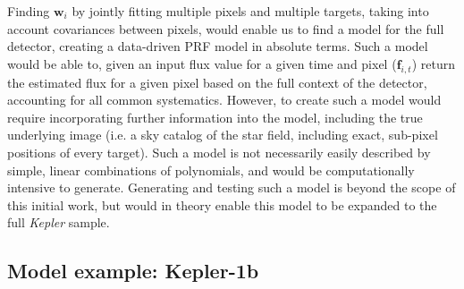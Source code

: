\documentclass[iop]{emulateapj}
\newcommand{\kepler}{\emph{Kepler}\xspace}
\newcommand{\target}{KIC 2708156\xspace}
\begin{document}
Finding $\mathbf{w}_i$ by jointly fitting multiple pixels and multiple targets, taking into account covariances between pixels, would enable us to find a model for the full detector, creating a data-driven PRF model in absolute terms. Such a model would be able to, given an input flux value for a given time and pixel ($\mathbf{f}_{i, t}$) return the estimated flux for a given pixel based on the full context of the detector, accounting for all common systematics. However, to create such a model would require incorporating further information into the model, including the true underlying image (i.e. a sky catalog of the star field, including exact, sub-pixel positions of every target). Such a model is not necessarily easily described by simple, linear combinations of polynomials, and would be computationally intensive to generate. Generating and testing such a model is beyond the scope of this initial work, but would in theory enable this model to be expanded to the full \kepler sample.

\subsection{Model example: Kepler-1b}
\label{sec:exampleplanet}



\end{document}
